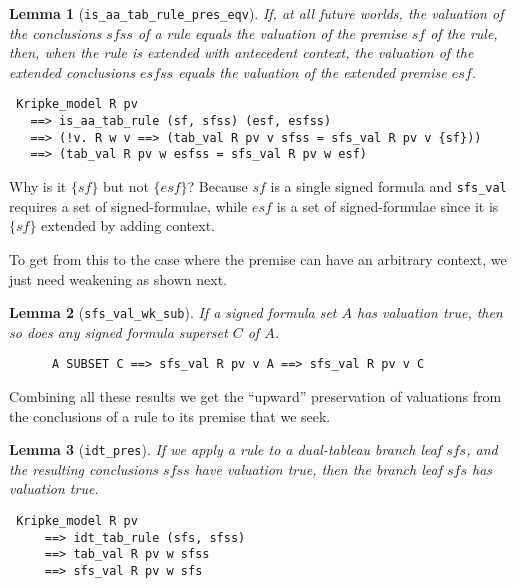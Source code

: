 \documentclass[a4paper]{article}
\newtheorem{lemma}{Lemma}
\begin{document}
\begin{lemma}[\texttt{is\_aa\_tab\_rule\_pres\_eqv}] 
  \label{is-aa-tab-rule-pres-eqv}
  If, at all future worlds, the valuation of the conclusions
  $\mathit{sfss}$ of a rule
  equals the valuation of the premise $\mathit{sf}$ of the rule,
  then, when the rule is extended with antecedent context,
  the valuation of the  extended conclusions $\mathit{esfss}$
    equals the valuation of the extended premise $\mathit{esf}$.
\end{lemma}
\begin{verbatim}
 Kripke_model R pv 
   ==> is_aa_tab_rule (sf, sfss) (esf, esfss) 
   ==> (!v. R w v ==> (tab_val R pv v sfss = sfs_val R pv v {sf}))
   ==> (tab_val R pv w esfss = sfs_val R pv w esf)
\end{verbatim}
Why is it $\{sf\}$ but not $\{esf\}$?
Because $sf$ is a single signed formula and \texttt{sfs\_val} requires
a set of signed-formulae, while $esf$ is a set of signed-formulae since
it is $\{sf\}$ extended by adding context.

To get from this to the case where the premise can have an arbitrary context,
we just need weakening as shown next.

\begin{lemma}[\texttt{sfs\_val\_wk\_sub}] \label{sfs-val-wk-sub}
If a signed formula set $A$ has valuation true,
then so does any signed formula superset $C$ of $A$.
\end{lemma}
\begin{verbatim}
      A SUBSET C ==> sfs_val R pv v A ==> sfs_val R pv v C
\end{verbatim}

Combining all these results we get the ``upward'' preservation of
valuations from the conclusions of a rule to its premise that we seek.
\begin{lemma}[\texttt{idt\_pres}] \label{idt-pres}
  If we apply a rule to a dual-tableau branch leaf $\mathit{sfs}$,
  and the resulting conclusions $\mathit{sfss}$
  have valuation true,
  then the branch leaf $\mathit{sfs}$ has valuation true.
\end{lemma}
\begin{verbatim}
 Kripke_model R pv 
     ==> idt_tab_rule (sfs, sfss) 
     ==> tab_val R pv w sfss 
     ==> sfs_val R pv w sfs
\end{verbatim}
\end{document}

